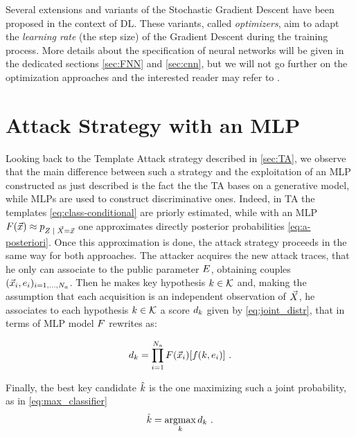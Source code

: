 Several extensions and variants of the Stochastic Gradient Descent have been proposed in the context of DL. These variants, called \emph{optimizers}, aim to adapt the \emph{learning rate} (the step size) of the Gradient Descent during the training process. More details about the
specification of neural networks will be given in the dedicated sections \ref{sec:FNN} and
\ref{sec:cnn}, but we will not go further on the optimization approaches and the
interested reader may refer to \cite{Goodfellow-et-al-2016}. 

\section{Attack Strategy with an MLP}
Looking back to the Template Attack strategy described in \ref{sec:TA}, we observe that the main difference between such a strategy and the exploitation of an MLP constructed as just described is the fact the the TA bases on a generative model, while MLPs are used to construct discriminative ones. Indeed, in TA the templates \eqref{eq:class-conditional} are priorly estimated, while with an MLP $\MLmodel(\vLeakVec) \approx \pdf_{\given{\sensRandVar}{\vaLeakVec=\vLeakVec}}$ one approximates directly posterior probabilities \eqref{eq:a-posteriori}. Once this approximation is done, the attack strategy proceeds in the same way for both approaches. The attacker acquires the new attack traces, that he only can associate to the public parameter $E$, obtaining couples  $(\vec{x}_i, e_i)_{i=1, \dots , N_a}$. Then he makes key hypothesis $k \in \mathcal{K}$ and, making the assumption that each acquisition is an independent observation of $\vec{X}$, he associates to each hypothesis $k \in \mathcal{K}$ a score $d_k$ given by \eqref{eq:joint_distr}, that in terms of MLP model $F$ rewrites  as:

\begin{equation}\label{eq:NN_SCA}
d_{k} = \prod_{i=1}^{N_a} F(\vec{x}_i)[f(k,e_i)] \mbox{ .}
\end{equation}

Finally, the best key candidate $\hat{k}$ is the one maximizing such a joint probability, as in \eqref{eq:max_classifier}
\begin{equation}
\hat{k} = \operatorname*{argmax}_{k} d_{k} \mbox{ .}
\end{equation}





